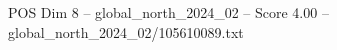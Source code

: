 \begin{textsample}{POS Dim 8 – global\_north\_2024\_02 – Score 4.00 – global\_north\_2024\_02/105610089.txt}
\end{textsample}
